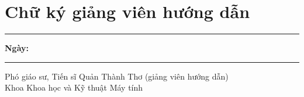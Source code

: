 \section*{Chữ ký giảng viên hướng dẫn}
\thispagestyle{empty}

\vspace{5cm}

\noindent\rule{0.65\textwidth}{0.5pt}
\hfill
\textbf{Ngày:} \rule{0.25\textwidth}{0.5pt}

\noindent Phó giáo sư, Tiến sĩ Quản Thành Thơ (giảng viên hướng dẫn) \\
Khoa Khoa học và Kỹ thuật Máy tính
\clearpage